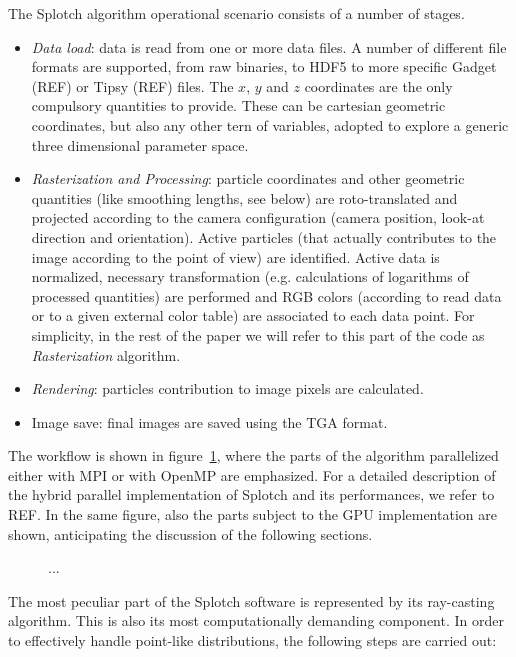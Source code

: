 \documentclass[11pt]{article}
\begin{document}
The Splotch algorithm operational scenario consists of a number of stages. 
\begin{itemize}
\item
{\it Data load}: data is read from one or more data files. A number of different file
formats are supported, from raw binaries, to HDF5 to more specific Gadget (REF) or Tipsy (REF)
files. The $x$, $y$ and $z$ coordinates are the only compulsory quantities to provide.
These can be cartesian geometric coordinates, but also any other tern 
of variables, adopted to explore a generic three dimensional parameter space.
\item
{\it Rasterization and Processing}: particle coordinates and other geometric quantities 
(like smoothing lengths, see below) are roto-translated and projected according to the 
camera configuration (camera position, look-at direction and orientation). 
Active particles (that actually contributes to the image according to the point of view)
are identified. Active data is normalized, necessary 
transformation (e.g. calculations of logarithms of processed quantities) are performed
and RGB colors (according to read data or to a given
external color table) are associated to each data point. For simplicity, in the rest 
of the paper we will refer to this part of the code as {\it Rasterization} algorithm.
\item
{\it Rendering}: particles contribution to image pixels are calculated.
\item
Image save: final images are saved using the TGA format.
\end{itemize}
The workflow is shown in figure~\ref{fig:workflow}, where the parts of the algorithm parallelized
either with MPI or with OpenMP are emphasized. For a detailed description of
the hybrid parallel implementation of Splotch and its performances, we refer to REF.
In the same figure, also the parts subject to the GPU implementation are shown, 
anticipating the discussion of the following sections.

\begin{figure}
\centering
\caption{...}
\label{fig:workflow}
\end{figure}

The most peculiar part of the Splotch software is represented by its ray-casting algorithm.
This is also its most computationally demanding component.
In order to effectively handle point-like distributions, the following 
steps are carried out: 
\end{document}
